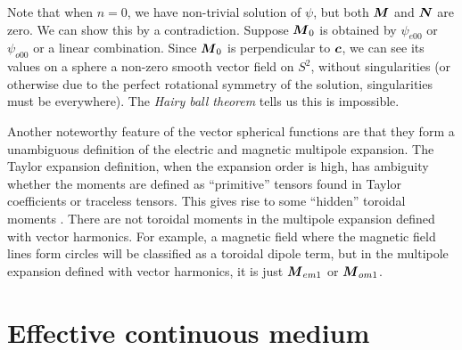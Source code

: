 \documentclass[hyperref, a4paper]{article}
\begin{document}
Note that when $n=0$, we have non-trivial solution of $\psi$, but both $\vb*{M}$ and $\vb*{N}$ are zero.
We can show this by a contradiction. Suppose $\vb*{M}_0$ is obtained by $\psi_{e00}$ or $\psi_{o00}$ or a 
linear combination. Since $\vb*{M}_0$ is perpendicular to $\vb*{c}$, we can see its values on a sphere 
a non-zero smooth vector field on $S^2$, without singularities (or otherwise due to the perfect rotational 
symmetry of the solution, singularities must be everywhere). The \emph{Hairy ball theorem} tells us 
this is impossible. 

Another noteworthy feature of the vector spherical functions are that they form a unambiguous definition 
of the electric and magnetic multipole expansion. The Taylor expansion definition, when the expansion order is high,
has ambiguity whether the moments are defined as ``primitive'' tensors found in Taylor coefficients 
or traceless tensors. This gives rise to some ``hidden'' toroidal moments \cite{toroidal}. 
There are not toroidal moments in the multipole expansion defined with vector harmonics. 
For example, a magnetic field where the magnetic field lines form circles will be classified as a toroidal 
dipole term, but in the multipole expansion defined with vector harmonics, it is just $\vb*{M}_{em1}$ or $\vb*{M}_{om1}$.

\section{Effective continuous medium}
\end{document}
